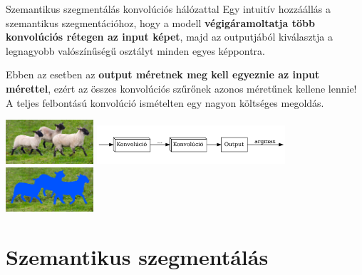 \documentclass[english, aspectratio=169]{beamer}
\makeatletter
\let\origtableofcontents=\tableofcontents
\def\tableofcontents{\@ifnextchar[{\origtableofcontents}{\gobbletableofcontents}}
\def\gobbletableofcontents#1{\origtableofcontents}
\makeatother
\begin{document}
\begin{frame}{Szemantikus szegmentálás konvolúciós hálózattal}
Egy intuitív hozzáállás a szemantikus szegmentációhoz, hogy a modell \textbf{végigáramoltatja több konvolúciós rétegen az input képet}, majd az outputjából kiválasztja a legnagyobb valószínűségű osztályt minden egyes képpontra.\par\smallskip
Ebben az esetben az \textbf{output méretnek meg kell egyeznie az input mérettel}, ezért az összes konvolúciós szűrőnek azonos méretűnek kellene lennie! A teljes felbontású konvolúció ismételten egy nagyon költséges megoldás.  
\begin{center}
\vspace{.5cm}
\includegraphics[width=3.25cm, keepaspectratio]{images/instance_9.png}
\includegraphics[width=7cm, keepaspectratio]{graphs/instance_1.png}
\includegraphics[width=3.25cm, keepaspectratio]{images/instance_10.png}
\end{center}
\end{frame}

\section{Szemantikus szegmentálás}

\begin{frame}
\tableofcontents[currentsection]
\end{frame}
\end{document}
